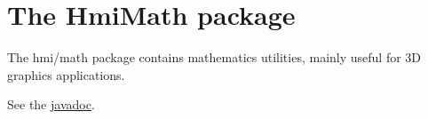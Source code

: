 \ifx \hmimathreportdir \undefinedmacro {} \fi
\ifx \webserver \undefinedmacro \def \webserver{http://elckerlyc.sourceforge.net/javadoc/Hmi/} \fi

\chapter{The HmiMath package}
The hmi/math package contains mathematics utilities, mainly useful for 3D graphics applications.

See the \href{\webserver}{javadoc}.
%
